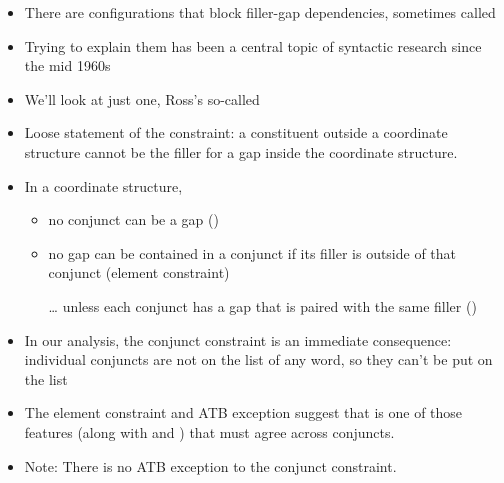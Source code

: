 \documentclass[a4paper,landscape,headrule,footrule]{foils}
\begin{document}
\begin{itemize}
\item There are configurations that block filler-gap
dependencies, sometimes called 
\item Trying to explain them has been a central topic of
syntactic research since the mid 1960s
\item We'll look at just one, Ross's so-called
\item Loose statement of the constraint: a constituent
outside a coordinate structure cannot be the filler
for a gap inside the coordinate structure.
\end{itemize}


\begin{exe}
  \ex {}
  \ex {}
  \ex {}
  \ex {}
  \ex {}
\end{exe}

\begin{itemize}
\item In a coordinate structure,
  \begin{itemize}
  \item no conjunct can be a gap ()
  \item no gap can be contained in a conjunct if its filler is
    outside of that conjunct (element constraint)
  \item[\ldots] unless each conjunct has a gap that is paired
with the same filler ()
\end{itemize}
\end{itemize}

\begin{itemize}
\item In our analysis, the conjunct constraint is an immediate
consequence: individual conjuncts are not on the  list
of any word, so they can't be put on the  list
\item The element constraint and ATB exception suggest that 
is one of those features (along with  and ) that
must agree across conjuncts.
\item Note: There is no ATB exception to the conjunct constraint.
  \begin{exe}
    \ex {}
  \end{exe}
\end{itemize}
\end{document}
